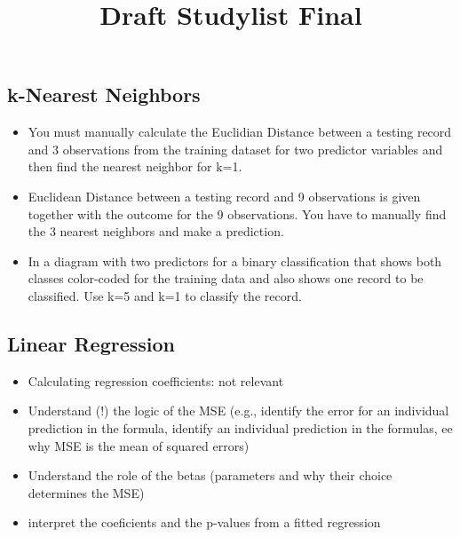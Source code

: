 \documentclass[
  letterpaper,
  DIV=11,
  numbers=noendperiod]{scrartcl}
\title{Draft Studylist Final}
\author{}
\date{}
\begin{document}
\maketitle
\ifdefined\Shaded\renewenvironment{Shaded}{\begin{tcolorbox}[sharp corners, borderline west={3pt}{0pt}{shadecolor}, frame hidden, enhanced, interior hidden, boxrule=0pt, breakable]}{\end{tcolorbox}}\fi

\hypertarget{k-nearest-neighbors}{%
\subsection{k-Nearest Neighbors}\label{k-nearest-neighbors}}

\begin{itemize}
\item
  You must manually calculate the Euclidian Distance between a testing
  record and 3 observations from the training dataset for two predictor
  variables and then find the nearest neighbor for k=1.
\item
  Euclidean Distance between a testing record and 9 observations is
  given together with the outcome for the 9 observations. You have to
  manually find the 3 nearest neighbors and make a prediction.
\item
  In a diagram with two predictors for a binary classification that
  shows both classes color-coded for the training data and also shows
  one record to be classified. Use k=5 and k=1 to classify the record.
\end{itemize}

\hypertarget{linear-regression}{%
\subsection{Linear Regression}\label{linear-regression}}

\begin{itemize}
\item
  Calculating regression coefficients: not relevant
\item
  Understand (!) the logic of the MSE (e.g., identify the error for an
  individual prediction in the formula, identify an individual
  prediction in the formulas, ee why MSE is the mean of squared errors)
\item
  Understand the role of the betas (parameters and why their choice
  determines the MSE)
\item
  interpret the coeficients and the p-values from a fitted regression
\end{itemize}
\end{document}

